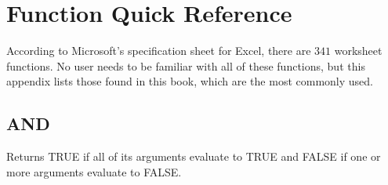 %



\chapter{Function Quick Reference}\label{app01:functions}

According to Microsoft's specification sheet for Excel, there are $ 341 $ worksheet functions. No user needs to be familiar with all of these functions, but this appendix lists those found in this book, which are the most commonly used.

\section{AND}

Returns TRUE if all of its arguments evaluate to TRUE and FALSE if one or more arguments evaluate to FALSE.

